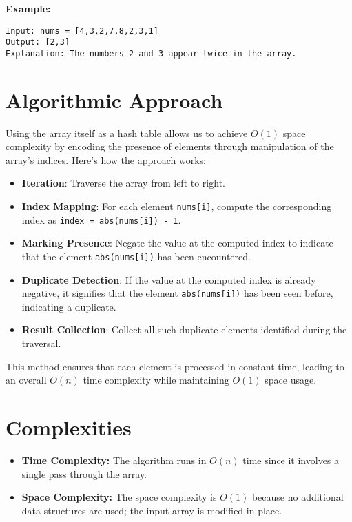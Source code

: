 \textbf{Example:}
\begin{verbatim}
Input: nums = [4,3,2,7,8,2,3,1]
Output: [2,3]
Explanation: The numbers 2 and 3 appear twice in the array.
\end{verbatim}


\section*{Algorithmic Approach}

Using the array itself as a hash table allows us to achieve \(O(1)\) space complexity by encoding the presence of elements through manipulation of the array's indices. Here's how the approach works:

\begin{itemize}
    \item \textbf{Iteration}: Traverse the array from left to right.
    \item \textbf{Index Mapping}: For each element \texttt{nums[i]}, compute the corresponding index as \texttt{index = abs(nums[i]) - 1}.
    \item \textbf{Marking Presence}: Negate the value at the computed index to indicate that the element \texttt{abs(nums[i])} has been encountered.
    \item \textbf{Duplicate Detection}: If the value at the computed index is already negative, it signifies that the element \texttt{abs(nums[i])} has been seen before, indicating a duplicate.
    \item \textbf{Result Collection}: Collect all such duplicate elements identified during the traversal.
\end{itemize}

This method ensures that each element is processed in constant time, leading to an overall \(O(n)\) time complexity while maintaining \(O(1)\) space usage.

\section*{Complexities}

\begin{itemize}
    \item \textbf{Time Complexity:} The algorithm runs in \(O(n)\) time since it involves a single pass through the array.
    
    \item \textbf{Space Complexity:} The space complexity is \(O(1)\) because no additional data structures are used; the input array is modified in place.
\end{itemize}

